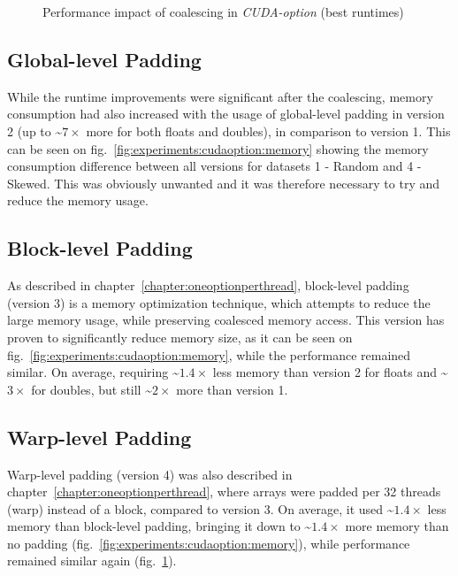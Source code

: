 \begin{figure}[H]
\begin{subfigure}{.49\textwidth}
\end{subfigure}
\begin{center}
  \small
\end{center}
\begin{center}
  \small
\end{center}
\caption{Performance impact of coalescing in \textit{CUDA-option} (best runtimes)}
\label{fig:experiments:cudaoption:versions}
\end{figure}

\newpage
\subsection{Global-level Padding}
While the runtime improvements were significant after the coalescing, memory consumption had also increased with the usage of global-level padding in version 2 (up to \textasciitilde$7\times$ more for both floats and doubles), in comparison to version 1. This can be seen on fig.~\ref{fig:experiments:cudaoption:memory} showing the memory consumption difference between all versions for datasets 1 - Random and 4 - Skewed. This was obviously unwanted and it was therefore necessary to try and reduce the memory usage.

\subsection{Block-level Padding}
As described in chapter~\ref{chapter:oneoptionperthread}, block-level padding (version 3) is a memory optimization technique, which attempts to reduce the large memory usage, while preserving coalesced memory access. This version has proven to significantly reduce memory size, as it can be seen on fig.~\ref{fig:experiments:cudaoption:memory}, while the performance remained similar. On average, requiring \textasciitilde$1.4\times$ less memory than version 2 for floats and \textasciitilde$3\times$ for doubles, but still \textasciitilde$2\times$ more than version 1.

\subsection{Warp-level Padding}
Warp-level padding (version 4) was also described in chapter~\ref{chapter:oneoptionperthread}, where arrays were padded per 32 threads (warp) instead of a block, compared to version 3. On average, it used \textasciitilde$1.4\times$ less memory than block-level padding, bringing it down to \textasciitilde$1.4\times$ more memory than no padding (fig.~\ref{fig:experiments:cudaoption:memory}), while performance remained similar again (fig.~\ref{fig:experiments:cudaoption:versions}).

